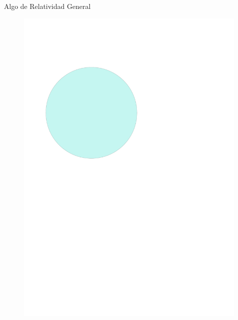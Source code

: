 \documentclass[11pt]{beamer}
\begin{document}
\begin{frame}{Algo de Relatividad General}
    \begin{figure}
        \centering
        \includegraphics[page=2,scale=0.65]{GR.pdf}
    \end{figure}
\end{frame}
\end{document}
